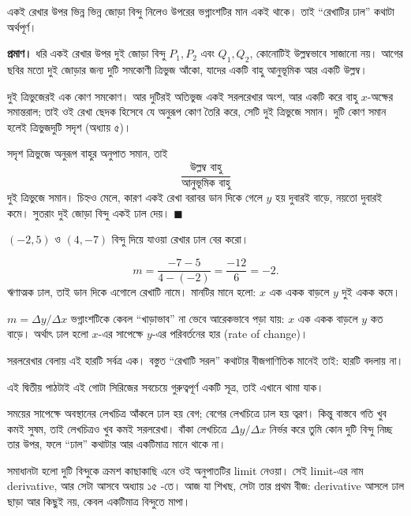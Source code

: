 \documentclass[11pt]{article}
\begin{document}
\begin{idea}[ঢাল কোন দুটি বিন্দু নিলে তার উপর নির্ভর করে না]
একই রেখার উপর ভিন্ন ভিন্ন জোড়া বিন্দু নিলেও উপরের ভগ্নাংশটির মান একই থাকে।
তাই ``রেখাটির ঢাল'' কথাটা অর্থপূর্ণ।
\end{idea}

\noindent
\textbf{প্রমাণ।} ধরি একই রেখার উপর দুই জোড়া বিন্দু $P_1, P_2$ এবং $Q_1, Q_2$,
কোনোটিই উল্লম্বভাবে সাজানো নয়। আগের ছবির মতো দুই জোড়ার জন্য দুটি সমকোণী
ত্রিভুজ আঁকো, যাদের একটি বাহু আনুভূমিক আর একটি উল্লম্ব।

দুই ত্রিভুজেরই এক কোণ সমকোণ। আর দুটিরই অতিভুজ একই সরলরেখার অংশ, আর একটি
করে বাহু $x$-অক্ষের সমান্তরাল; তাই ওই রেখা ছেদক হিসেবে যে অনুরূপ কোণ তৈরি
করে, সেটি দুই ত্রিভুজে সমান। দুটি কোণ সমান হলেই ত্রিভুজদুটি সদৃশ
(অধ্যায় ৫)।

সদৃশ ত্রিভুজে অনুরূপ বাহুর অনুপাত সমান, তাই
\[
  \frac{\text{উল্লম্ব বাহু}}{\text{আনুভূমিক বাহু}}
\]
দুই ত্রিভুজে সমান। চিহ্নও মেলে, কারণ একই রেখা বরাবর ডান দিকে গেলে $y$ হয়
দুবারই বাড়ে, নয়তো দুবারই কমে। সুতরাং দুই জোড়া বিন্দু একই ঢাল দেয়।
$\blacksquare$

\begin{example}
$(-2, 5)$ ও $(4, -7)$ বিন্দু দিয়ে যাওয়া রেখার ঢাল বের করো।
\end{example}

\begin{solbox}
\[
  m = \frac{-7 - 5}{4 - (-2)} = \frac{-12}{6} = -2 .
\]
ঋণাত্মক ঢাল, তাই ডান দিকে এগোলে রেখাটি নামে। মানটির মানে হলো: $x$ এক একক
বাড়লে $y$ দুই একক কমে।
\end{solbox}

\begin{idea}[ঢাল হলো পরিবর্তনের হার]
$m = \Delta y / \Delta x$ ভগ্নাংশটিকে কেবল ``খাড়াভাব'' না ভেবে আরেকভাবে পড়া
যায়: $x$ এক একক বাড়লে $y$ কত বাড়ে। অর্থাৎ ঢাল হলো $x$-এর সাপেক্ষে $y$-এর
পরিবর্তনের হার (rate of change)।

সরলরেখার বেলায় এই হারটি সর্বত্র এক। বস্তুত ``রেখাটি সরল'' কথাটার বীজগাণিতিক
মানেই তাই: হারটি বদলায় না।
\end{idea}

\begin{remark}
এই দ্বিতীয় পাঠটাই এই গোটা সিরিজের সবচেয়ে গুরুত্বপূর্ণ একটি সূত্র, তাই এখানে
থামা যাক।

সময়ের সাপেক্ষে অবস্থানের লেখচিত্র আঁকলে ঢাল হয় বেগ; বেগের লেখচিত্রে ঢাল হয়
ত্বরণ। কিন্তু বাস্তবে গতি খুব কমই সুষম, তাই লেখচিত্রও খুব কমই সরলরেখা।
বাঁকা লেখচিত্রে $\Delta y / \Delta x$ নির্ভর করে তুমি কোন দুটি বিন্দু নিচ্ছ
তার উপর, ফলে ``ঢাল'' কথাটার আর একটিমাত্র মানে থাকে না।

সমাধানটা হলো দুটি বিন্দুকে ক্রমশ কাছাকাছি এনে ওই অনুপাতটির limit নেওয়া। সেই
limit-এর নাম derivative, আর সেটা আসবে অধ্যায় ১৫  -তে। আজ যা শিখছ, সেটা তার
প্রথম বীজ: derivative আসলে ঢাল ছাড়া আর কিছুই নয়, কেবল একটিমাত্র বিন্দুতে
মাপা।
\end{remark}
\end{document}

